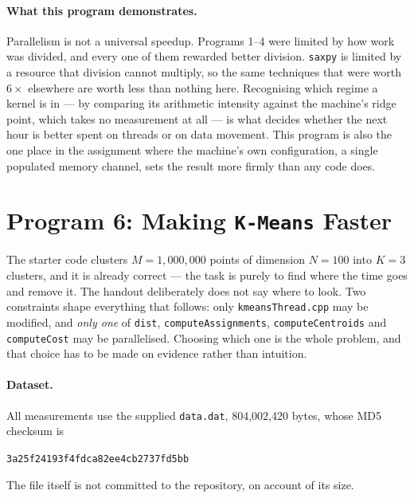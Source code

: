 \documentclass[11pt,a4paper]{article}
\begin{document}
\paragraph{What this program demonstrates.} Parallelism is not a universal
speedup. Programs 1--4 were limited by how work was divided, and every one of
them rewarded better division. \texttt{saxpy} is limited by a resource that
division cannot multiply, so the same techniques that were worth $6\times$
elsewhere are worth less than nothing here. Recognising which regime a kernel
is in --- by comparing its arithmetic intensity against the machine's ridge
point, which takes no measurement at all --- is what decides whether the next
hour is better spent on threads or on data movement. This program is also the
one place in the assignment where the machine's own configuration, a single
populated memory channel, sets the result more firmly than any code does.


\section{Program 6: Making \texttt{K-Means} Faster}
\label{sec:prog6}

The starter code clusters $M = 1{,}000{,}000$ points of dimension $N = 100$
into $K = 3$ clusters, and it is already correct --- the task is purely to find
where the time goes and remove it. The handout deliberately does not say where
to look. Two constraints shape everything that follows: only
\texttt{kmeansThread.cpp} may be modified, and \emph{only one} of
\texttt{dist}, \texttt{computeAssignments}, \texttt{computeCentroids} and
\texttt{computeCost} may be parallelised. Choosing which one is the whole
problem, and that choice has to be made on evidence rather than intuition.

\paragraph{Dataset.} All measurements use the supplied \texttt{data.dat},
804{,}002{,}420 bytes, whose MD5 checksum is

\begin{center}
\texttt{3a25f24193f4fdca82ee4cb2737fd5bb}
\end{center}

\noindent The file itself is not committed to the repository, on account of its
size.
\end{document}
